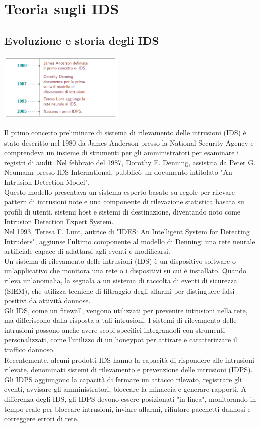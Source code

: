 \documentclass[12pt,a4paper,oneside,onecolumn,openright]{book}
\begin{document}
\section{Teoria sugli IDS}
\subsection{Evoluzione e storia degli IDS}
\begin{table}
	\includegraphics[width=0.45\textwidth]{IDStimeline.png}
\end{table} 
Il primo concetto preliminare di sistema di rilevamento delle intrusioni (IDS) 
è stato descritto nel 1980 da James Anderson presso la National Security Agency 
e comprendeva un insieme di strumenti per gli amministratori per esaminare i registri 
di audit. Nel febbraio del 1987, Dorothy E. Denning, assistita da Peter G. Neumann 
presso IDS International, pubblicò un documento intitolato "An Intrusion Detection Model".\\
Questo modello presentava un sistema esperto basato su regole per rilevare pattern 
di intrusioni note e una componente di rilevazione statistica basata su profili di 
utenti, sistemi host e sistemi di destinazione, diventando noto come Intrusion Detection 
Expert System.\\
Nel 1993, Teresa F. Lunt, autrice di "IDES: An Intelligent System for Detecting Intruders", 
aggiunse l'ultimo componente al modello di Denning: una rete neurale artificiale capace di 
adattarsi agli eventi e modificarsi. \\
Un sistema di rilevamento delle intrusioni (IDS) è un dispositivo software o un'applicativo 
che monitora una rete o i dispositivi su cui è installato. Quando rileva un'anomalia, 
la segnala a un sistema di raccolta di eventi di sicurezza (SIEM), che utilizza tecniche 
di filtraggio degli allarmi per distinguere falsi positivi da attività dannose.\\
Gli IDS, come un firewall, vengono utilizzati per prevenire intrusioni nella rete, 
ma differiscono dalla risposta a tali intrusioni. I sistemi di rilevamento delle 
intrusioni possono anche avere scopi specifici integrandoli con strumenti personalizzati, 
come l'utilizzo di un honeypot per attirare e caratterizzare il traffico dannoso.\\
Recentemente, alcuni prodotti IDS hanno la capacità di rispondere alle intrusioni 
rilevate, denominati sistemi di rilevamento e prevenzione delle intrusioni (IDPS). 
Gli IDPS aggiungono la capacità di fermare un attacco rilevato, registrare gli eventi, 
avvisare gli amministratori, bloccare la minaccia e generare rapporti. A differenza 
degli IDS, gli IDPS devono essere posizionati "in linea", monitorando in tempo reale 
per bloccare intrusioni, inviare allarmi, rifiutare pacchetti dannosi e correggere 
errori di rete.\\
\end{document}

